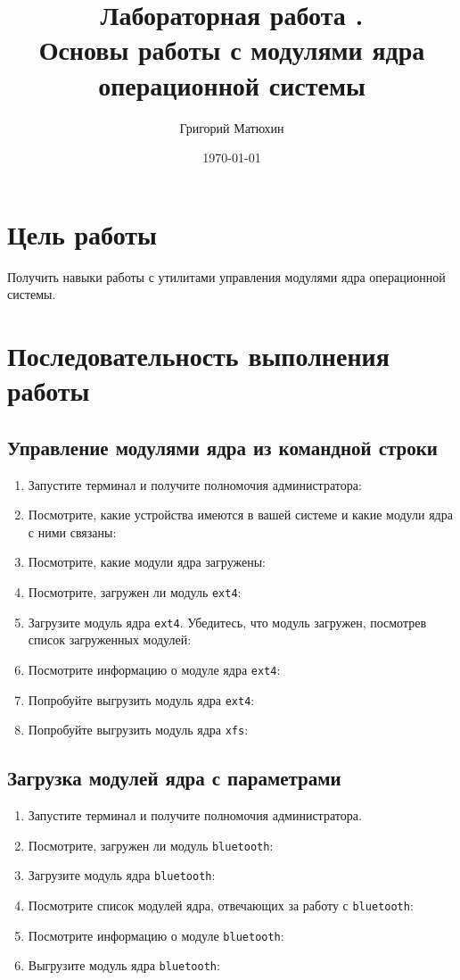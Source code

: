 \documentclass[12pt]{article}
\author{Григорий Матюхин}
\date{\today}
\title{Лабораторная работа \textnumero10.\\Основы работы с модулями ядра операционной системы}
\begin{document}
\maketitle
\newpage
\tableofcontents
\newpage
\section{Цель работы}
Получить навыки работы с утилитами управления модулями ядра операционной системы.

\section{Последовательность выполнения работы}
\subsection{Управление модулями ядра из командной строки}
\begin{enumerate}
	\item Запустите терминал и получите полномочия администратора:
	\item Посмотрите, какие устройства имеются в вашей системе и какие модули ядра с ними связаны:
	\item Посмотрите, какие модули ядра загружены:
	\item Посмотрите, загружен ли модуль \texttt{ext4}:
	\item Загрузите модуль ядра \texttt{ext4}. Убедитесь, что модуль загружен, посмотрев список загруженных модулей:
	\item Посмотрите информацию о модуле ядра \texttt{ext4}:
	\item Попробуйте выгрузить модуль ядра \texttt{ext4}:
	\item Попробуйте выгрузить модуль ядра \texttt{xfs}:
\end{enumerate}

\subsection{Загрузка модулей ядра с параметрами}
\begin{enumerate}
	\item Запустите терминал и получите полномочия администратора.
	\item Посмотрите, загружен ли модуль \texttt{bluetooth}:
	\item Загрузите модуль ядра \texttt{bluetooth}:
	\item Посмотрите список модулей ядра, отвечающих за работу с \texttt{bluetooth}:
	\item Посмотрите информацию о модуле \texttt{bluetooth}:
	\item Выгрузите модуль ядра \texttt{bluetooth}:
\end{enumerate}
\end{document}
